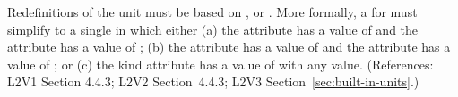 Redefinitions of the  unit  must be
based on ,  or .  More
formally, a \UnitDefinition for  must simplify to a single
\Unit in which either (a) the  attribute has a value of
 and the  attribute has a value of ; (b)
the  attribute has a value of  and the
 attribute has a value of ; or (c) the kind
attribute has a value of  with any 
value.  (References: L2V1 Section 4.4.3; L2V2 Section~4.4.3; L2V3
Section~\ref{sec:built-in-units}.)
